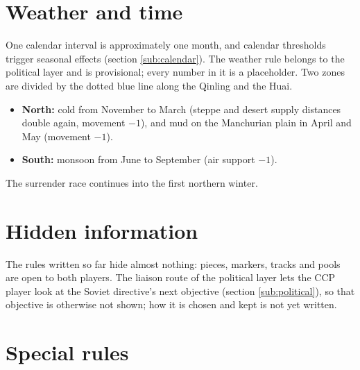 \documentclass[11pt]{article}
\begin{document}
\section{Weather and time}\label{sec:weather}
One calendar interval is approximately one month, and calendar thresholds trigger seasonal effects (section \ref{sub:calendar}). The weather rule belongs to the political layer and is provisional; every number in it is a placeholder. Two zones are divided by the dotted blue line along the Qinling and the Huai.
\begin{itemize}
\item \textbf{North:} cold from November to March (steppe and desert supply distances double again, movement $-1$), and mud on the Manchurian plain in April and May (movement $-1$).
\item \textbf{South:} monsoon from June to September (air support $-1$).
\end{itemize}
The surrender race continues into the first northern winter.

\section{Hidden information}\label{sec:fog}
The rules written so far hide almost nothing: pieces, markers, tracks and pools are open to both players. The liaison route of the political layer lets the CCP player look at the Soviet directive's next objective (section \ref{sub:political}), so that objective is otherwise not shown; how it is chosen and kept is not yet written.

\section{Special rules}\label{sec:special}
\end{document}
